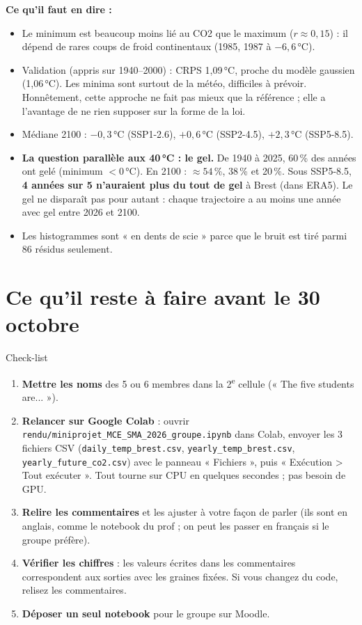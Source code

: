 \documentclass[11pt,a4paper]{article}
\newcommand{\f}[1]{\texttt{#1}}
\begin{document}
\textbf{Ce qu'il faut en dire :}
\begin{itemize}
  \item Le minimum est beaucoup moins lié au CO2 que le maximum ($r\approx 0{,}15$) : il dépend de rares coups de froid continentaux (1985, 1987 à $-6{,}6$\,°C).
  \item Validation (appris sur 1940--2000) : CRPS 1,09\,°C, proche du modèle gaussien (1,06\,°C). Les minima sont surtout de la météo, difficiles à prévoir. Honnêtement, cette approche ne fait pas mieux que la référence ; elle a l'avantage de ne rien supposer sur la forme de la loi.
  \item Médiane 2100 : $-0{,}3$\,°C (SSP1-2.6), $+0{,}6$\,°C (SSP2-4.5), $+2{,}3$\,°C (SSP5-8.5).
  \item \textbf{La question parallèle aux 40\,°C : le gel.} De 1940 à 2025, 60\,\% des années ont gelé (minimum $<0$\,°C). En 2100 : $\approx 54$\,\%, 38\,\% et 20\,\%. Sous SSP5-8.5, \textbf{4 années sur 5 n'auraient plus du tout de gel} à Brest (dans ERA5). Le gel ne disparaît pas pour autant : chaque trajectoire a au moins une année avec gel entre 2026 et 2100.
  \item Les histogrammes sont « en dents de scie » parce que le bruit est tiré parmi 86 résidus seulement.
\end{itemize}

\section{Ce qu'il reste à faire avant le 30 octobre}\label{sec:reste}

\begin{cadre}{Check-list}
\begin{enumerate}
  \item \textbf{Mettre les noms} des 5 ou 6 membres dans la 2\textsuperscript{e} cellule (« The five students are... »).
  \item \textbf{Relancer sur Google Colab} : ouvrir \f{rendu/miniprojet\_MCE\_SMA\_2026\_groupe.ipynb} dans Colab, envoyer les 3 fichiers CSV (\f{daily\_temp\_brest.csv}, \f{yearly\_temp\_brest.csv}, \f{yearly\_future\_co2.csv}) avec le panneau « Fichiers », puis « Exécution > Tout exécuter ». Tout tourne sur CPU en quelques secondes ; pas besoin de GPU.
  \item \textbf{Relire les commentaires} et les ajuster à votre façon de parler (ils sont en anglais, comme le notebook du prof ; on peut les passer en français si le groupe préfère).
  \item \textbf{Vérifier les chiffres} : les valeurs écrites dans les commentaires correspondent aux sorties avec les graines fixées. Si vous changez du code, relisez les commentaires.
  \item \textbf{Déposer un seul notebook} pour le groupe sur Moodle.
\end{enumerate}
\end{cadre}
\end{document}
